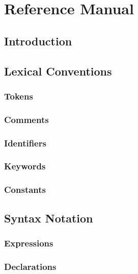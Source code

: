 \documentclass[12pt]{report}
\begin{document}
\chapter{Reference Manual}

\section{Introduction}

\begin{doublespace}
\end{doublespace}

\section{Lexical Conventions}

\subsection{Tokens}

\subsection{Comments}

\subsection{Identifiers}

\subsection{Keywords}

\subsection{Constants}

\section{Syntax Notation}

\subsection{Expressions}

\subsection{Declarations}
\end{document}
